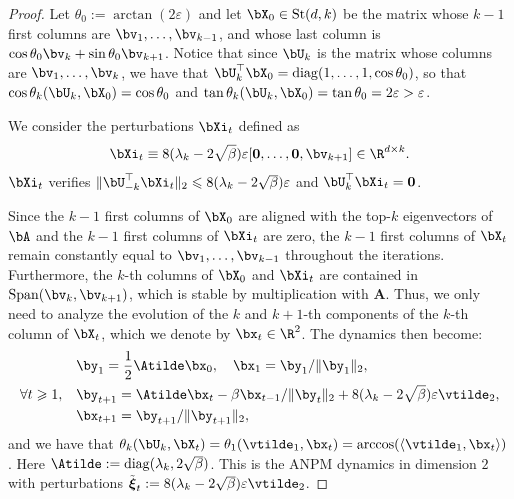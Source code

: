 \documentclass{article}
\theoremstyle{plain}
\theoremstyle{definition}
\theoremstyle{remark}
\begin{document}
\begin{proof}
  Let $\theta_0 := \arctan(2\varepsilon)$ and let $\bX_0 \in \mathrm{St}(d,k)$ be the matrix whose $k-1$ first columns are $\bv_1,\dots,\bv_{k-1}$, and whose last column is $\cos\theta_0\bv_k + \sin\theta_0 \bv_{k+1}$. Notice that since $\bU_k$ is the matrix whose columns are $\bv_1,\dots,\bv_k$, we have that $\bU_k^\top\bX_0 = \mathrm{diag}(1,\dots,1,\cos\theta_0)$, so that $\cos\theta_k(\bU_k,\bX_0) = \cos\theta_0$ and $\tan \theta_k(\bU_k, \bX_0) = \tan \theta_0 = 2\varepsilon > \varepsilon$.

  We consider the perturbations $\bXi_t$ defined as
  \begin{align*}
    \bXi_t \equiv 8(\lambda_k - 2\sqrt{\beta})\varepsilon [\mathbf{0}, \dots, \mathbf{0}, \bv_{k+1}] \in \R^{d\times k}.
  \end{align*}
  $\bXi_t$ verifies $\Vert \bU_{-k}^\top \bXi_t \Vert_2 \leqslant 8(\lambda_k - 2\sqrt{\beta})\varepsilon$ and $\bU_k^\top \bXi_t = \mathbf{0}$.

  Since the $k-1$ first columns of $\bX_0$ are aligned with the top-$k$ eigenvectors of $\bA$ and the $k-1$ first columns of $\bXi_t$ are zero, the $k-1$ first columns of $\bX_t$ remain constantly equal to $\bv_1,\dots,\bv_{k-1}$ throughout the iterations. Furthermore, the $k$-th columns of $\bX_0$ and $\bXi_t$ are contained in $\mathrm{Span}(\bv_k,\bv_{k+1})$, which is stable by multiplication with $\mathbf{A}$. Thus, we only need to analyze the evolution of the $k$ and $k+1$-th components of the $k$-th column of $\bX_t$, which we denote by $\bx_t \in \R^2$. The dynamics then become:
  \begin{align*}
    & \by_1  = \frac{1}{2}\Atilde \bx_0, \quad \bx_1= \by_1/\Vert\by_1\Vert_2, \\
    \forall t \geqslant 1, \quad&  \by_{t+1}  = \Atilde \bx_t - \beta \bx_{t-1} /\Vert\by_t\Vert_2 + 8(\lambda_k - 2\sqrt{\beta})\varepsilon \vtilde_2, \\
    & \bx_{t+1} = \by_{t+1}/\Vert \by_{t+1} \Vert_2,
  \end{align*}
  and we have that $\theta_k(\bU_k, \bX_t) = \theta_1(\vtilde_1, \bx_t) = \arccos(\langle\vtilde_1,\bx_t \rangle)$. Here $\Atilde := \mathrm{diag}(\lambda_k, 2\sqrt{\beta})$. This is the ANPM dynamics in dimension $2$ with perturbations $\tilde{\boldsymbol{\xi}}_t := 8(\lambda_k - 2\sqrt{\beta})\varepsilon \vtilde_2$. 
  

\end{proof}
\end{document}
